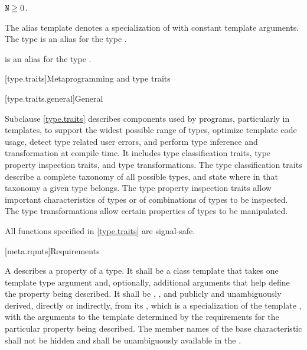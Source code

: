\begin{itemdescr}
\pnum
\mandates
$\texttt{\protect N} \geq 0$.

\pnum
The alias template
 denotes a specialization of
 with  constant template arguments.
The type  is an alias for the type
.
\begin{note}
 is an alias for the type
.
\end{note}
\end{itemdescr}

[type.traits]{Metaprogramming and type traits}

[type.traits.general]{General}

\pnum
Subclause \ref{type.traits} describes components used by \Cpp{} programs, particularly in
templates, to support the widest possible range of types, optimize
template code usage, detect type related user errors, and perform
type inference and transformation at compile time. It includes type
classification traits, type property inspection traits, and type
transformations. The type classification traits describe a complete taxonomy
of all possible \Cpp{} types, and state where in that taxonomy a given
type belongs. The type property inspection traits allow important
characteristics of types or of combinations of types to be inspected. The
type transformations allow certain properties of types to be manipulated.

\pnum
{}%
All functions specified in \ref{type.traits} are signal-safe.

[meta.rqmts]{Requirements}

\pnum
A  describes a property
of a type. It shall be a class template that takes one template type
argument and, optionally, additional arguments that help define the
property being described. It shall be ,
,
and publicly and unambiguously derived, directly or indirectly, from
its , which is
a specialization of the template
, with
the arguments to the template  determined by the
requirements for the particular property being described.
The member names of the base characteristic shall not be hidden and shall be
unambiguously available in the .

